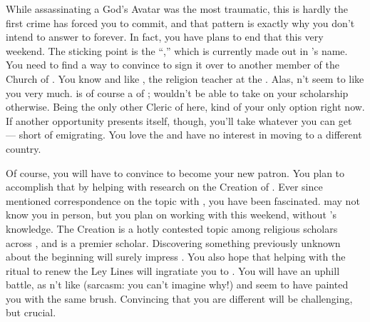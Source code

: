 \documentclass[char]{GL2020}
\begin{document}
While assassinating a God's Avatar was the most traumatic, this is hardly the first crime \cAntiChup{} has forced you to commit, and that pattern is exactly why you don't intend to answer to \cAntiChup{} forever. In fact, you have plans to end that this very weekend. The sticking point is the ``\iScholarship{},'' which is currently made out in \cAntiChup{}'s name. You need to find a way to convince \cAntiChup{} to sign it over to another member of the Church of \cTechGod{}. You know and like \cBeetle{\full}, the religion teacher at the \pSc{}. Alas, \cBeetle{\theydo}n't seem to like you very much. \cBeetle{} is of course a \cBeetle{\cleric} of \cTechGod{}; \cBeetle{\they} wouldn't be able to take on your scholarship otherwise. Being the only other Cleric of \cTechGod{} here, \cBeetle{\theyare} kind of your only option right now. If another opportunity presents itself, though, you'll take whatever you can get — short of emigrating. You love the \pTech{} and have no interest in moving to a different country. 

Of course, you will have to convince \cBeetle{} to become your new patron. You plan to accomplish that by helping \cEbbPriest{\intro} with \cEbbPriest{\their} research on the Creation of \pEarth{}. Ever since \cAntiChup{} mentioned \cAntiChup{\their} correspondence on the topic with \cEbbPriest{}, you have been fascinated. \cEbbPriest{} may not know you in person, but you plan on working with \cEbbPriest{\them} this weekend, without \cAntiChup{}’s knowledge. The Creation is a hotly contested topic among religious scholars across \pEarth{}, and \cBeetle{} is a premier scholar. Discovering something previously unknown about the beginning will surely impress \cBeetle{\them}. You also hope that helping with the ritual to renew the Ley Lines will ingratiate you to \cBeetle{}. You will have an uphill battle, as \cBeetle{\theydo}n't like \cAntiChup{} (sarcasm: you can't imagine why!) and seem\cBeetle{\verbs} to have painted you with the same brush. Convincing \cBeetle{\them} that you are different will be challenging, but crucial.
\end{document}
